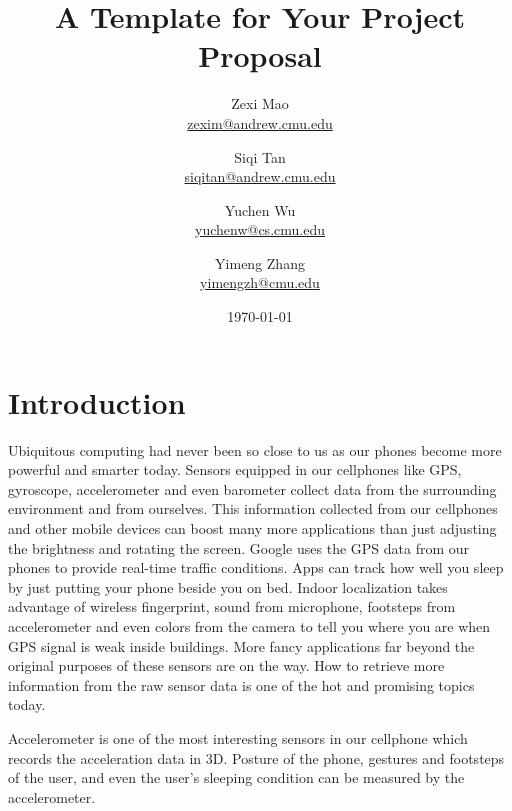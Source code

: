 \documentclass[12pt]{article}
\begin{document}

\title{A Template for Your Project Proposal}
\author{
		Zexi Mao \\
		\href{mailto:zexim@andrew.cmu.edu}{zexim@andrew.cmu.edu} \\
	\and
		Siqi Tan \\
		\href{mailto:siqitan@andrew.cmu.edu}{siqitan@andrew.cmu.edu} \\
	\and
		Yuchen Wu \\
		\href{mailto:yuchenw@cs.cmu.edu}{yuchenw@cs.cmu.edu} \\
	\and
		Yimeng Zhang \\
		\href{mailto:yimengzh@cmu.edu}{yimengzh@cmu.edu}
	}
\date{\today}



\maketitle


\section{Introduction}

Ubiquitous computing had never been so close to us as our phones become more powerful and smarter today. Sensors equipped in our cellphones like GPS, gyroscope, accelerometer and even barometer collect data from the surrounding environment and from ourselves. This information collected from our cellphones and other mobile devices can boost many more applications than just adjusting the brightness and rotating the screen. Google uses the GPS data from our phones to provide real-time traffic conditions. Apps can track how well you sleep by just putting your phone beside you on bed. Indoor localization takes advantage of wireless fingerprint, sound from microphone, footsteps from accelerometer and even colors from the camera to tell you where you are when GPS signal is weak inside buildings. More fancy applications far beyond the original purposes of these sensors are on the way. How to retrieve more information from the raw sensor data is one of the hot and promising topics today.

Accelerometer is one of the most interesting sensors in our cellphone which records the acceleration data in 3D. Posture of the phone, gestures and footsteps of the user, and even the user's sleeping condition can be measured by the accelerometer. 
\end{document}

